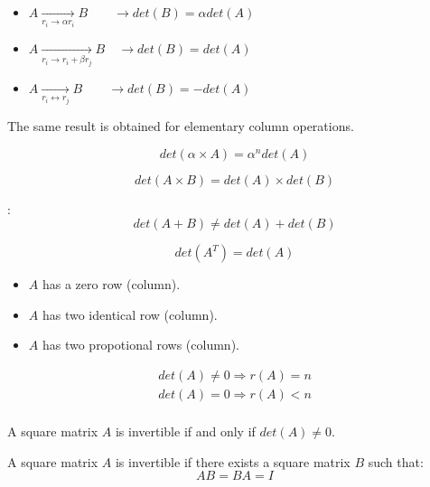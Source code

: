       \begin{itemize}
        \item $A \xrightarrow[r_{i} \to \alpha r_{i}]{} B \quad \quad
          \rightarrow det(B) = \alpha det(A)$
        \item $A \xrightarrow[r_{i} \to r_{i} + \beta r_{j}]{} B \quad
          \rightarrow det(B) = det(A)$
        \item $A \xrightarrow[r_{i} \leftrightarrow r_{j}]{} B \quad \quad
          \rightarrow det(B) = - det(A)$
      \end{itemize}
      \par The same result is obtained for elementary column operations.

      \[
        det(\alpha \times A) = \alpha^{n} det(A)
      \]

      \[
        det(A \times B) = det(A) \times det(B)
      \]
      \par {}:
      \[
        det(A + B) \neq det(A) + det(B)
      \]

      \[
        det(A^{T}) = det(A)
      \]

      \begin{itemize}
        \item $A$ has a zero row (column).
        \item $A$ has two identical row (column).
        \item $A$ has two propotional rows (column).
      \end{itemize}

      \begin{align*}
        det(A) \neq 0 \Rightarrow r(A) = n \\
        det(A) = 0 \Rightarrow r(A) < n \\
      \end{align*}
  \hiiEND


    \par A square matrix $A$ is invertible if and only if $det(A) \neq 0$.

    \par A square matrix $A$ is invertible if there exists a square matrix $B$
    such that:
    \[
      AB = BA = I
    \]

